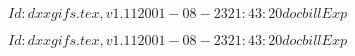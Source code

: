 \documentclass{article}
\begin{document}
$Id: dxxgifs.tex,v 1.11 2001-08-23 21:43:20 docbill Exp $


\pagebreak


$Id: dxxgifs.tex,v 1.11 2001-08-23 21:43:20 docbill Exp $


\pagebreak
\end{document}
